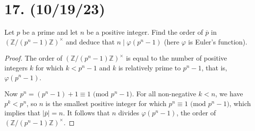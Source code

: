 \documentclass{article}
\begin{document}
\section*{17. (10/19/23)}

Let $p$ be a prime and let $n$ be a positive integer. Find the order of $\overline{p}$ in \\ $(\mathbb{Z}/(p^n - 1)\mathbb{Z})^\times$ and deduce that $n \mid \varphi(p^n - 1)$ (here $\varphi$ is Euler's function).

\begin{proof}
    The order of $(\mathbb{Z}/(p^n - 1)\mathbb{Z})^\times$ is equal to the number of positive integers $k$ for which $k < p^n - 1$ and $k$ is relatively prime to $p^n - 1$, that is, $\varphi(p^n - 1)$.

    Now $p^n = (p^n - 1) + 1 \equiv 1 \text{ (mod $p^n - 1$)}$. For all non-negative $k < n$, we have $p^k < p^n$, so $n$ is the smallest positive integer for which $p^n \equiv 1 \text{ (mod $p^n - 1$)}$, which implies that $|\overline{p}| = n$. It follows that $n$ divides $\varphi(p^n - 1)$, the order of $(\mathbb{Z}/(p^n - 1)\mathbb{Z})^\times$.
\end{proof}
\end{document}
